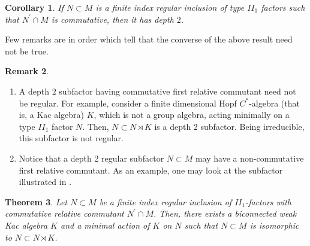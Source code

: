 \documentclass{amsart}
\newtheorem{theorem}{Theorem}[section]
\newtheorem{corollary}[theorem]{Corollary}
\theoremstyle{definition}
\theoremstyle{theorem}
\newtheorem{remark}[theorem]{Remark}
\begin{document}
\begin{corollary}\label{abelianrelativecommutant}
  If $N\subset M$ is a finite index regular inclusion of  type $II_1$ factors
  such that $N^{\prime}\cap M$ is commutative, then it has depth $2$.
\end{corollary}
Few remarks are in order which tell that the converse of the above
result need  not be true.
\begin{remark}
  \begin{enumerate}
  \item
    A depth $2$ subfactor having commutative first relative commutant need
    not be regular. For example, consider a finite dimensional Hopf
    $C^*$-algebra (that is, a Kac algebra) $K$, which is not a group
    algebra, acting minimally on a type $II_1$ factor $N$. Then,
    $N\subset N\rtimes K$ is a depth 2 subfactor. Being irreducible,
    this subfactor is not regular.
 \smallskip
 
 \item Notice that a depth 2 regular subfactor $N\subset M$ may have a
   non-commutative first relative commutant.  As an example, one may
 look at  the subfactor illustrated in .
 
 
\end{enumerate}
\end{remark} 
\begin{theorem}\label{mainresult}
Let $N\subset M$ be a finite
  index regular inclusion of $II_1$-factors with commutative relative
  commutant $N^{\prime}\cap M$. Then, there exists a biconnected weak
  Kac algebra $K$ and  a minimal action  of $K$ on $N$ such that
  $N\subset M$ is isomorphic to $N\subset N\rtimes K$.
\end{theorem}
\end{document}

